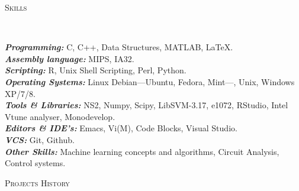 \documentclass[9pt]{article}
\newenvironment{changemargin}[2]{%
  \begin{list}{}{%
    \setlength{\topsep}{0pt}%
    \setlength{\leftmargin}{#1}%
    \setlength{\rightmargin}{#2}%
    \setlength{\listparindent}{\parindent}%
    \setlength{\itemindent}{\parindent}%
    \setlength{\parsep}{\parskip}%
  }%
  \item[]}{\end{list}
}
\newcommand{\lineover}{
	\begin{changemargin}{-0.05in}{-0.05in}
		\vspace*{-8pt}
		\hrulefill \\
		\vspace*{-2pt}
	\end{changemargin}
}
\newcommand{\header}[1]{
	\begin{changemargin}{-0.5in}{-0.5in}
		\scshape{#1}\\
  	\lineover
	\end{changemargin}
}
\newenvironment{body} {
	\vspace*{-16pt}
	\begin{changemargin}{-0.25in}{-0.5in}
  }	
	{\end{changemargin}
}
\begin{document}
\smallskip

\header{Skills}

\begin{body}
	\vspace{14pt}
	\emph{\textbf{Programming:}}{} C, C++, Data Structures, MATLAB, \LaTeX. \\
	\medskip
	\emph{\textbf{Assembly language:}}{} MIPS, IA32. \\
	\medskip
	\emph{\textbf{Scripting:}}{} R, Unix Shell Scripting, Perl, Python. \\
	\medskip
	\emph{\textbf{Operating Systems:}}{} Linux Debian---Ubuntu, Fedora, Mint---, Unix, Windows XP/7/8. \\
	\medskip
	\emph{\textbf{Tools \& Libraries:}}{} NS2, Numpy, Scipy, LibSVM-3.17, e1072, RStudio, Intel Vtune analyser, Monodevelop. \\
	\medskip
	\emph{\textbf{Editors \& IDE's:}}{} Emacs, Vi(M), Code Blocks, Visual Studio. \\
	\medskip
	\emph{\textbf{VCS:}}{} Git, Github.\\
	\medskip
	\emph{\textbf{Other Skills:}}{} Machine learning concepts and algorithms, Circuit Analysis, Control systems.
\end{body}

\smallskip

\header{Projects History}
\end{document}
